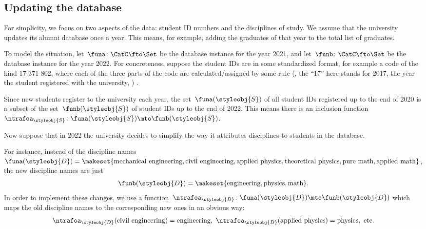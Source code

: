 \subsection{Updating the database}

For simplicity, we focus on two aspects of the data: student ID numbers and the disciplines of study.
We assume that the university updates its alumni database once a year.
This means, for example, adding the graduates of that year to the total list of graduates.

To model the situation, let~$\funa \colon \CatC \fto \Set$ be the database instance for the year 2021, and let~$\funb \colon \CatC \fto \Set$ be the database instance for the year 2022.
For concreteness,  suppose the student IDs are in some standardized format, for example a code of the kind 17-371-802, where each of the three parts of the code are calculated/assigned by some rule (, the ``17'' here stands for 2017, the year the student registered with the university, \etc)
.

Since new students register to the university each year, the set~$\funa(\styleobj{S})$ of all student IDs registered up to the end of 2020 is a subset of the set~$\funb(\styleobj{S})$ of student IDs up to the end of 2022.
This means there is an inclusion function~$\ntrafoa_{\styleobj{S}} \colon  \funa(\styleobj{S}) \mto \funb(\styleobj{S})$.

Now suppose that in 2022 the university decides to simplify the way it attributes disciplines to students in the database.

For instance, instead of the discipline names~$\funa(\styleobj{D}) = \makeset{ \text{mechanical engineering},  \text{civil}\ \text{engineering}, \text{applied}\ \text{physics}, \text{theoretical}\ \text{physics}, \text{pure}\ \text{math}, \linebreak[1]\text{applied}\ \text{math} }$, the new discipline names are just
%
\begin{equation}
    \funb(\styleobj{D}) = \makeset{ \text{engineering}, \text{physics}, \text{math} }.
\end{equation}
%
In order to implement these changes, we use a function~$\ntrafoa_{\styleobj{D}}\colon \funa(\styleobj{D}) \mto \funb(\styleobj{D})$ which maps the old discipline names to the corresponding new ones in an obvious way:
\begin{equation}
    \ntrafoa_{\styleobj{D}}(\text{civil engineering}) = \text{engineering}, \ \ntrafoa_{\styleobj{D}}(\text{applied physics}) = \text{physics}, \ \text{etc.}
\end{equation}

